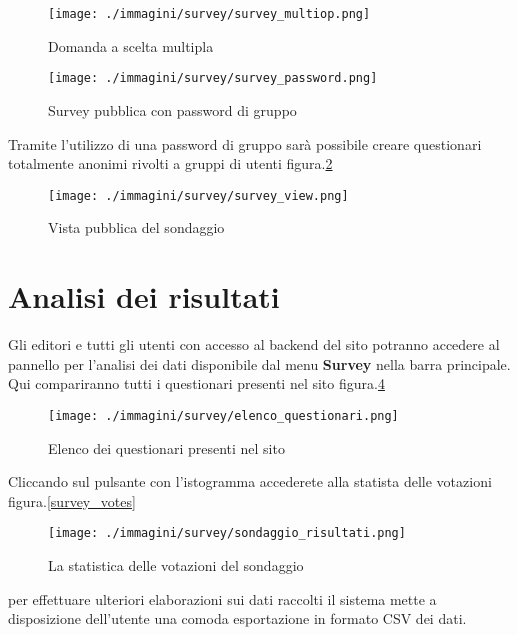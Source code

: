 \begin{figure}[H]
 \centering
 \texttt{[image: ./immagini/survey/survey\_multiop.png]}
 \caption{Domanda a scelta multipla}
 \label{fig:survey_multiop}
\end{figure}

\begin{figure}[H]
 \centering
 \texttt{[image: ./immagini/survey/survey\_password.png]}
 \caption{Survey pubblica con password di gruppo}
 \label{fig:survey_pwd}
\end{figure}

Tramite l'utilizzo di una password di gruppo sarà possibile creare questionari totalmente anonimi rivolti a gruppi di utenti figura.\ref{fig:survey_pwd}

\begin{figure}[H]
 \centering
 \texttt{[image: ./immagini/survey/survey\_view.png]}
 \caption{Vista pubblica del sondaggio}
 \label{fig:survey_view}
\end{figure}


\section{Analisi dei risultati}

Gli editori e tutti gli utenti con accesso al backend del sito potranno accedere al pannello per l'analisi dei dati disponibile dal menu \textbf{Survey} nella barra principale. Qui compariranno tutti i questionari presenti nel sito figura.\ref{fig:survey_list}

\begin{figure}[H]
 \centering
 \texttt{[image: ./immagini/survey/elenco\_questionari.png]}
 \caption{Elenco dei questionari presenti nel sito}
 \label{fig:survey_list}
\end{figure}

Cliccando sul pulsante con l'istogramma accederete alla statista delle votazioni  figura.\ref{survey_votes}

\begin{figure}[H]
 \centering
 \texttt{[image: ./immagini/survey/sondaggio\_risultati.png]}
 \caption{La statistica delle votazioni del sondaggio}
 \label{fig:survey_votes}
\end{figure}

per effettuare ulteriori elaborazioni sui dati raccolti il sistema mette a disposizione dell'utente una comoda esportazione in formato CSV dei dati.





